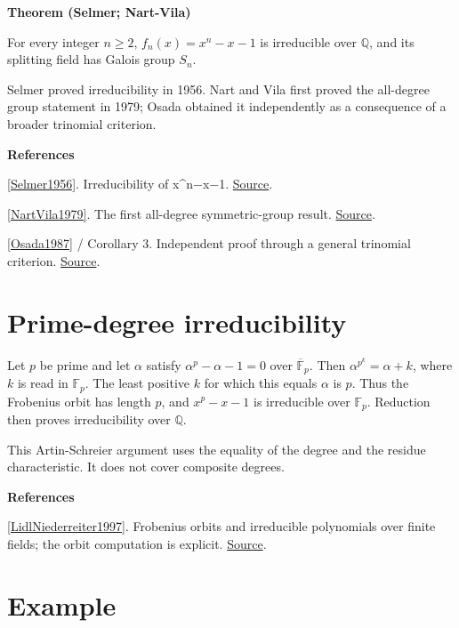 \documentclass[11pt,a4paper,oneside,openany]{book}
\newenvironment{sources}{\par\smallskip\begingroup\footnotesize\color{atlasgray}\leftskip=10pt\setlength{\parskip}{2pt}}{\par\endgroup\smallskip}
\begin{document}
\begin{atlasblock}[standard]
\textbf{\sffamily Theorem (Selmer; Nart-Vila)}\par\smallskip
\color{black} For every integer \(n\ge2\), \(f_n(x)=x^n-x-1\) is irreducible over \(\mathbb Q\), and its splitting field has Galois group \(S_n\).\par
\end{atlasblock}\color{black}
\color{black} Selmer proved irreducibility in 1956. Nart and Vila first proved the all-degree group statement in 1979; Osada obtained it independently as a consequence of a broader trinomial criterion.\par
\begin{sources}
\textbf{References}\par\smallskip
\noindent\hyperlink{ref:Selmer1956}{[Selmer1956]}. Irreducibility of x\textasciicircum{}n\ensuremath{-}x\ensuremath{-}1. \href{https://doi.org/10.7146/math.scand.a-10478}{Source}.\par
\noindent\hyperlink{ref:NartVila1979}{[NartVila1979]}. The first all-degree symmetric-group result. \href{https://portalrecerca.uab.cat/en/publications/equations-of-the-type-xnaxb-with-absolute-galois-group-sn/}{Source}.\par
\noindent\hyperlink{ref:Osada1987}{[Osada1987]} / Corollary 3. Independent proof through a general trinomial criterion. \href{https://doi.org/10.1016/0022-314X(87)90029-1}{Source}.\par
\end{sources}\color{black}
\section{Prime-degree irreducibility}

\begin{atlasblock}[standard]
\color{black} Let \(p\) be prime and let \(\alpha\) satisfy \(\alpha^p-\alpha-1=0\) over \(\overline{\mathbb F}_p\). Then \(\alpha^{p^k}=\alpha+k\), where \(k\) is read in \(\mathbb F_p\). The least positive \(k\) for which this equals \(\alpha\) is \(p\). Thus the Frobenius orbit has length \(p\), and \(x^p-x-1\) is irreducible over \(\mathbb F_p\). Reduction then proves irreducibility over \(\mathbb Q\).\par
\end{atlasblock}\color{black}
\color{black} This Artin-Schreier argument uses the equality of the degree and the residue characteristic. It does not cover composite degrees.\par
\begin{sources}
\textbf{References}\par\smallskip
\noindent\hyperlink{ref:LidlNiederreiter1997}{[LidlNiederreiter1997]}. Frobenius orbits and irreducible polynomials over finite fields; the orbit computation is explicit. \href{https://www.cambridge.org/core/books/finite-fields/75BDAA74ABAE713196E718392B9E5E72}{Source}.\par
\end{sources}\color{black}
\section{Example}
\end{document}
